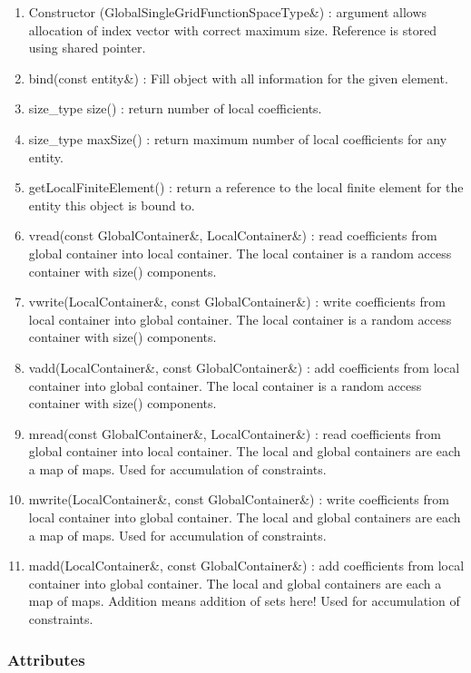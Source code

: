 \documentclass[11pt,a4paper,DIV11,%
notitlepage,oneside,abstracton,%
bibtotoc]{scrartcl}
\begin{document}
\begin{enumerate}[1)]
\item Constructor (GlobalSingleGridFunctionSpaceType\&) : argument allows
  allocation of index vector with correct maximum size. Reference is
  stored using shared pointer.
\item bind(const entity\&) : Fill object with all information for the
  given element.
\item size\_type size() : return number of local coefficients.
\item size\_type maxSize() : return maximum number of local
  coefficients for any entity.
\item getLocalFiniteElement() : return a reference to the local finite
  element for the entity this object is bound to.
\item vread(const GlobalContainer\&, LocalContainer\&) : read
  coefficients from global container into local container. The local
  container is a random access container with size() components.
\item vwrite(LocalContainer\&, const GlobalContainer\&) : write
  coefficients from local container into global container. The local
  container is a random access container with size() components.
\item vadd(LocalContainer\&, const GlobalContainer\&) : add
  coefficients from local container into global container. The local
  container is a random access container with size() components.
\item mread(const GlobalContainer\&, LocalContainer\&) : read
  coefficients from global container into local container. The local
  and global containers are each a map of maps. Used for accumulation
  of constraints.
\item mwrite(LocalContainer\&, const GlobalContainer\&) : write
  coefficients from local container into global container. The local
  and global containers are each a map of maps.  Used for accumulation
  of constraints.
\item madd(LocalContainer\&, const GlobalContainer\&) : add
  coefficients from local container into global container. The local
  and global containers are each a map of maps. Addition means
  addition of sets here!  Used for accumulation
  of constraints.
 \end{enumerate}

\subsubsection{Attributes}
\end{document}
